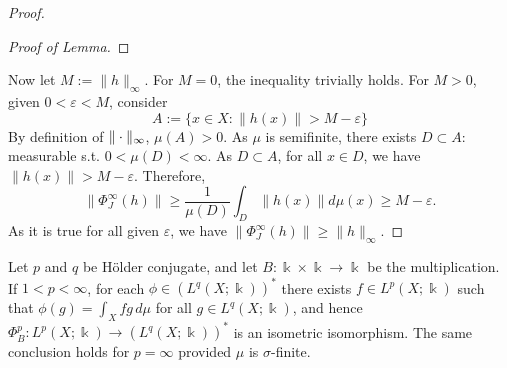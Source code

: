 \begin{proof}
\begin{proof}[Proof of Lemma]
\end{proof}
Now let $M:=\|h\|_\infty$. For $M=0$, the inequality trivially holds. For $M>0$, given $0<\varepsilon<M$, consider
\begin{equation*}
    A:=\{x\in X: \|h(x)\|>M-\varepsilon\}
\end{equation*}
By definition of $\|\cdot\|_\infty$, $\mu(A)>0$. As $\mu$ is semifinite, there exists $D\subset A$: measurable s.t. $0<\mu(D)<\infty$.
As $D\subset A$, for all $x\in D$, we have $\|h(x)\|>M-\varepsilon$. Therefore,
\begin{equation*}
    \|\Phi^\infty_J(h)\|\geq \frac{1}{\mu(D)}\int_D \|h(x)\|d\mu(x)\geq M-\varepsilon.
\end{equation*}
As it is true for all given $\varepsilon$, we have $\|\Phi_J^\infty(h)\|\geq \|h\|_\infty$.
\end{proof}


\begin{theorem}
Let $p$ and $q$ be H\"{o}lder conjugate, and let $B:\Bbbk\times\Bbbk\rightarrow\Bbbk$ be the multiplication.
If $1<p<\infty$, for each $\phi\in(L^q(X;\Bbbk))^*$ there exists $f\in L^p(X;\Bbbk)$ such that
$\phi(g)=\int_X fg\, d\mu$ for all $g\in L^q(X;\Bbbk)$, and hence
$\Phi_B^p:L^p(X;\Bbbk)\rightarrow(L^q(X;\Bbbk))^*$ is an isometric isomorphism.
The same conclusion holds for $p=\infty$ provided $\mu$ is $\sigma$-finite.
\end{theorem}















